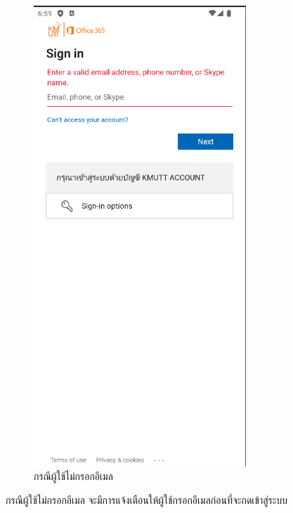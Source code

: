 \documentclass[14pt,oneside,openright,a4paper]{cpe-thai-project}
\begin{document}
\begin{figure}[!h]\centering
  \includegraphics[width=8cm]{./Pictures/Scene1.png}
  \caption{กรณีผู้ใช้ไม่กรอกอีเมล}\label{fig:NoEmailTest}
\end{figure}
  \hspace*{1cm} กรณีผู้ใช้ไม่กรอกอีเมล จะมีการแจ้งเตือนให้ผู้ใช้กรอกอีเมลก่อนที่จะกดเข้าสู่ระบบ

\newpage
\end{document}

